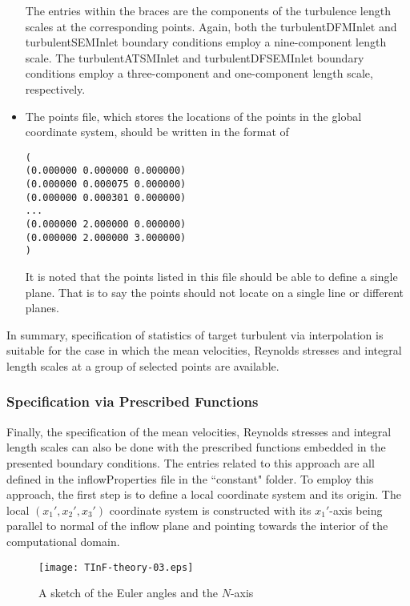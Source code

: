 \begin{itemize}
The entries within the braces are the components of the turbulence length scales at the corresponding points. Again, both the \textcolor{mauve}{turbulentDFMInlet} and \textcolor{mauve}{turbulentSEMInlet} boundary conditions employ a nine-component length scale. The \textcolor{mauve}{turbulentATSMInlet} and \textcolor{mauve}{turbulentDFSEMInlet} boundary conditions employ a three-component and one-component length scale, respectively.

\item The \textcolor{mauve}{points} file, which stores the locations of the points in the global coordinate system, should be written in the format of

\begin{lstlisting} 
(
(0.000000 0.000000 0.000000)
(0.000000 0.000075 0.000000)
(0.000000 0.000301 0.000000)
...
(0.000000 2.000000 0.000000)
(0.000000 2.000000 3.000000)
)
\end{lstlisting}

It is noted that the points listed in this file should be able to define a single plane. That is to say the points should not locate on a single line or different planes.

\end{itemize}

\noindent In summary, specification of statistics of target turbulent via interpolation is suitable for the case in which the mean velocities, Reynolds stresses and integral length scales at a group of selected points are available.

\subsubsection{Specification via Prescribed Functions} \label{sectionSPF}

Finally, the specification of the mean velocities, Reynolds stresses and integral length scales can also be done with the prescribed functions embedded in the presented boundary conditions. The entries related to this approach are all defined in the \textcolor{mauve}{inflowProperties} file in the \textcolor{mauve}{``constant"} folder. To employ this approach, the first step is to define a local coordinate system and its origin. The local $(x_1',x_2',x_3')$ coordinate system is constructed with its $x_1'$-axis being parallel to normal of the inflow plane and pointing towards the interior of the computational domain.

\begin{figure}[H]
\centering
\texttt{[image: TInF-theory-03.eps]}
\caption{A sketch of the Euler angles and the $N$-axis} \label{EulerAngles}
\end{figure}


